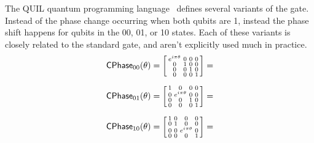 The QUIL quantum programming language~\cite{Smith2016a, ???} defines several variants of the  gate. Instead of the phase change occurring  when both qubits are 1, instead the phase shift happens for qubits in the 00, 01, or 10 states. Each of these variants is closely related to the standard  gate, and aren't explicitly used much in practice. 
$$
{\sf{CPhase}}_{00}(\theta) = 
\begin{bsmallmatrix}
 e^{i \pi \theta} & 0 & 0 & 0 \\
  0 & 1  & 0  & 0 \\
  0 & 0  & 1 & 0 \\
 0  & 0 & 0 &  1
\end{bsmallmatrix}
= 
$$

$$
{\sf{CPhase}}_{01}(\theta) = 
\begin{bsmallmatrix}
 1 & 0 & 0 & 0 \\
  0 & e^{i \pi \theta}  & 0  & 0 \\
  0 & 0  & 1 & 0 \\
 0  & 0 & 0 & 1
\end{bsmallmatrix}
= 
$$


$$
{\sf{CPhase}}_{10}(\theta) = 
\begin{bsmallmatrix}
 1 & 0 & 0 & 0 \\
  0 & 1  & 0  & 0 \\
  0 & 0  & e^{i \pi \theta} & 0 \\
 0  & 0 & 0 & 1
\end{bsmallmatrix}
= 
$$



